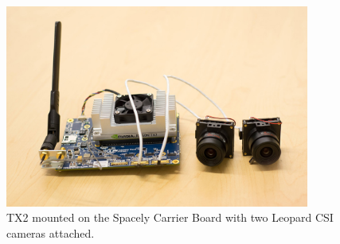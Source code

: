 \documentclass[letterpaper,10pt,serif,draftclsnofoot,onecolumn,compsoc,titlepage]{IEEEtran}
\begin{document}
\begin{figure}[H]
	\centering
	\label{fig:TX2 mounted on the Spacely Carrier Board with two CSI cameras attached.}
	\includegraphics[width=10cm]{images/spacely.eps}
	\caption{TX2 mounted on the Spacely Carrier Board with two Leopard CSI cameras attached. \label{overflow}}
\end{figure}



\nocite{*}
\newpage


\end{document}
